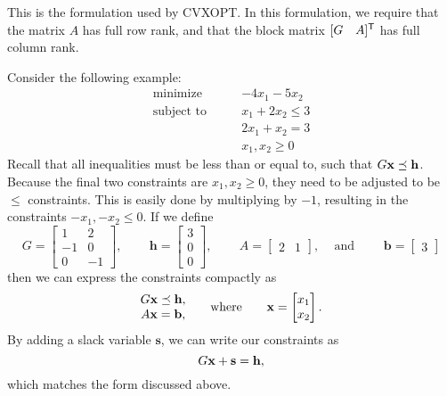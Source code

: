 This is the formulation used by CVXOPT.
In this formulation, we require that the matrix $A$ has full row rank,
and that the block matrix $[G \quad A]^{\mathsf T} $ has full column rank.


\begin{comment}
The corresponding \emph{dual program} for the above linear program has the form
\begin{align*}
\text{maximize}\qquad &-h\trp z - b\trp y \\
\text{subject to}\qquad &G\trp z + A\trp y + c = 0\\
 &z \geq 0.
\end{align*}
CVXOPT provides functions to solve both the original (\emph{primal}) linear program and its dual program.
\end{comment}

Consider the following example:
\begin{align*}
\text{minimize}\qquad &-4x_1-5x_2 \\
\text{subject to}\qquad &x_1+2x_2 \leq 3 \\
	        &2x_1+x_2 = 3 \\
		&x_1, x_2 \geq 0
\end{align*}
Recall that all inequalities must be less than or equal to, such that $G\mathbf{x}\preceq \mathbf{h}$.
Because the final two constraints are $x_1, x_2 \geq 0$, they need to be adjusted to be $\leq$ constraints.
This is easily done by multiplying by $-1$, resulting in the constraints $-x_1, -x_2 \leq 0$.
If we define
\[
G = \begin{bmatrix}
  1 & 2\\
  -1 & 0\\
  0 & -1
\end{bmatrix} \text{, } \qquad
\mathbf{h} = \begin{bmatrix}
  3\\
  0\\
  0
\end{bmatrix} \text{, } \qquad
A = \begin{bmatrix}
2 & 1
\end{bmatrix} \text{, } \quad \text{and } \qquad
\mathbf{b} = \begin{bmatrix}
3
\end{bmatrix}
\]
then we can express the constraints compactly as
\[
\begin{matrix}
G\mathbf{x} \preceq \mathbf{h},\\
A\mathbf{x} = \mathbf{b},
\end{matrix}  \qquad \text{where} \qquad
\mathbf{x} = \begin{bmatrix}
  x_1\\
  x_2
\end{bmatrix}.
\]
By adding a slack variable $\mathbf{s}$, we can write our constraints as
\[
G\mathbf{x} + \mathbf{s} = \mathbf{h},
\]
which matches the form discussed above.

